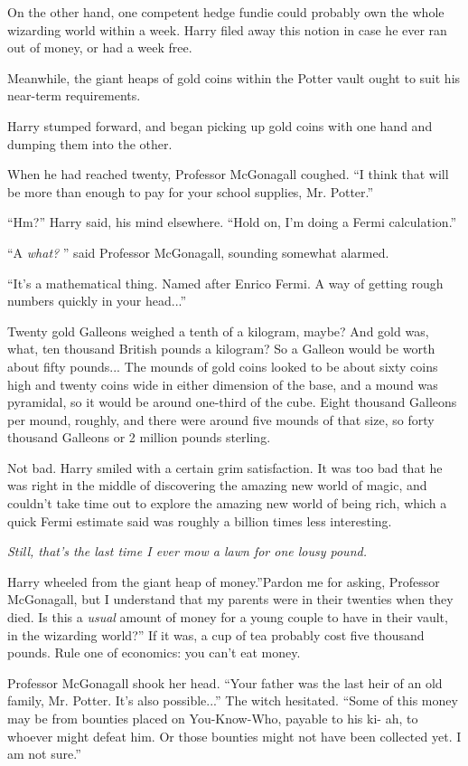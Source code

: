 On the other hand, one competent hedge fundie could probably own the
whole wizarding world within a week. Harry filed away this notion in
case he ever ran out of money, or had a week free.

Meanwhile, the giant heaps of gold coins within the Potter vault ought
to suit his near-term requirements.

Harry stumped forward, and began picking up gold coins with one hand and
dumping them into the other.

When he had reached twenty, Professor McGonagall coughed. ``I think that
will be more than enough to pay for your school supplies, Mr. Potter.''

``Hm?'' Harry said, his mind elsewhere. ``Hold on, I'm doing a Fermi
calculation.''

``A \emph{what?} '' said Professor McGonagall, sounding somewhat alarmed.

``It's a mathematical thing. Named after Enrico Fermi. A way of getting
rough numbers quickly in your head...''

Twenty gold Galleons weighed a tenth of a kilogram, maybe? And gold was,
what, ten thousand British pounds a kilogram? So a Galleon would be
worth about fifty pounds... The mounds of gold coins looked to be
about sixty coins high and twenty coins wide in either dimension of the
base, and a mound was pyramidal, so it would be around one-third of the
cube. Eight thousand Galleons per mound, roughly, and there were around
five mounds of that size, so forty thousand Galleons or 2 million pounds
sterling.

Not bad. Harry smiled with a certain grim satisfaction. It was too bad
that he was right in the middle of discovering the amazing new world of
magic, and couldn't take time out to explore the amazing new world of
being rich, which a quick Fermi estimate said was roughly a billion
times less interesting.

\emph{Still, that's the last time I ever mow a lawn for one lousy
pound.}

Harry wheeled from the giant heap of money.''Pardon me for asking,
Professor McGonagall, but I understand that my parents were in their
twenties when they died. Is this a \emph{usual} amount of money for a
young couple to have in their vault, in the wizarding world?'' If it
was, a cup of tea probably cost five thousand pounds. Rule one of
economics: you can't eat money.

Professor McGonagall shook her head. ``Your father was the last heir of
an old family, Mr. Potter. It's also possible...'' The witch
hesitated. ``Some of this money may be from bounties placed on
You-Know-Who, payable to his ki- ah, to whoever might defeat him. Or
those bounties might not have been collected yet. I am not sure.''

